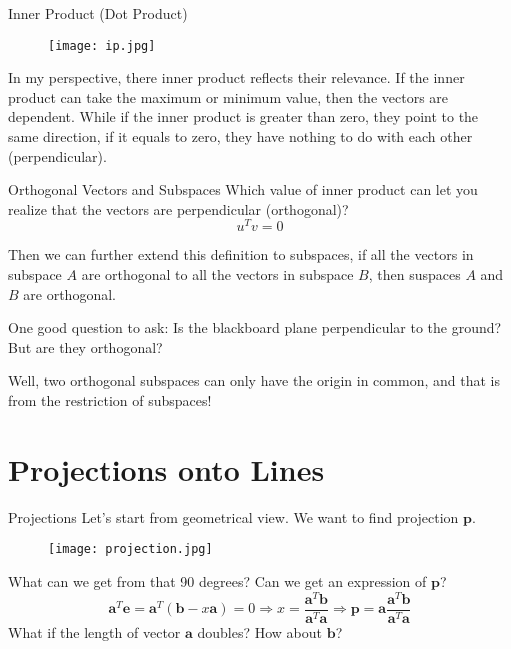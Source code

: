 \documentclass{beamer}
\begin{document}
\begin{frame}{Inner Product (Dot Product)}
\begin{figure}
    \centering
    \texttt{[image: ip.jpg]}
\end{figure}

In my perspective, there inner product reflects their relevance. If the inner product can take the maximum or minimum value, then the vectors are dependent. While if the inner product is greater than zero, they point to the same direction, if it equals to zero, they have nothing to do with each other (perpendicular).
\end{frame}

\begin{frame}{Orthogonal Vectors and Subspaces}
Which value of inner product can let you realize that the vectors are perpendicular (\alert{orthogonal})?
\begin{equation*}
    u^Tv=0
\end{equation*}

Then we can further extend this definition to subspaces, if all the vectors in subspace $A$ are orthogonal to all the vectors in subspace $B$, then suspaces $A$ and $B$ are orthogonal.

\vspace{3pt}
One good question to ask: Is the blackboard plane perpendicular to the ground? But are they orthogonal?

\vspace{3pt}
Well, two orthogonal subspaces can only have the origin in common, and that is from the restriction of subspaces!
\end{frame}

\section{Projections onto Lines}
\begin{frame}{Projections}
Let's start from geometrical view. We want to find projection $\mathbf{p}$.
\begin{figure}
    \centering
    \texttt{[image: projection.jpg]}
\end{figure}

What can we get from that 90 degrees? Can we get an expression of $\mathbf{p}$?
\begin{equation*}
    \mathbf{a}^T\mathbf{e}=\mathbf{a}^T\left( \mathbf{b}-x\mathbf{a} \right) =0\Rightarrow x=\frac{\mathbf{a}^T\mathbf{b}}{\mathbf{a}^T\mathbf{a}}\Rightarrow \mathbf{p}=\mathbf{a}\frac{\mathbf{a}^T\mathbf{b}}{\mathbf{a}^T\mathbf{a}}
\end{equation*}
What if the length of vector $\mathbf{a}$ doubles? How about $\mathbf{b}$?
\end{frame}
\end{document}

